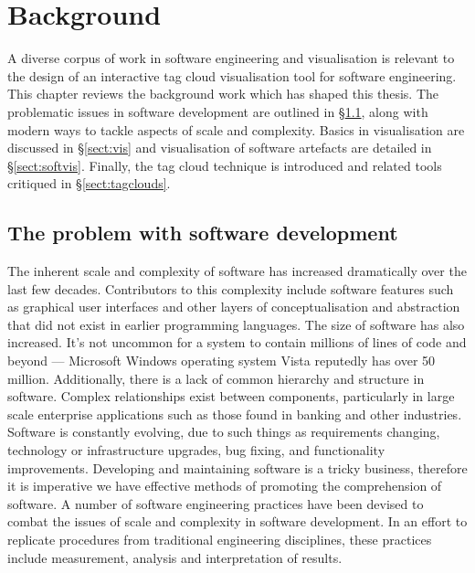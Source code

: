 
\chapter{Background}\label{chap:background}
\ifpdf
    \graphicspath{{Chapters/Background/BackgroundFigs/PNG/}{Background/BackgroundFigs/PDF/}{Chapters/Background/BackgroundFigs/}}
\else
    \graphicspath{{Chapters/Background/BackgroundFigs/EPS/}{Chapters/Background/BackgroundFigs/}}
\fi

A diverse corpus of work in software engineering and visualisation is relevant to the design of an interactive tag cloud visualisation tool for software engineering. This chapter reviews the background work which has shaped this thesis. The problematic issues in software development are outlined in \S\ref{sect:problemsoftware}, along with modern ways to tackle aspects of scale and complexity. Basics in visualisation are discussed in \S\ref{sect:vis} and visualisation of software artefacts are detailed in \S\ref{sect:softvis}. Finally, the tag cloud technique is introduced and related tools critiqued in \S\ref{sect:tagclouds}.

\section{The problem with software development}\label{sect:problemsoftware}

The inherent scale and complexity of software has increased dramatically over the last few decades. Contributors to this complexity include software features such as graphical user interfaces and other layers of conceptualisation and abstraction that did not exist in earlier programming languages. The size of software has also increased. It's not uncommon for a system to contain millions of lines of code and beyond --- Microsoft Windows operating system Vista reputedly has over 50 million. Additionally, there is a lack of common hierarchy and structure in software. Complex relationships exist between components, particularly in large scale enterprise applications such as those found in banking and other industries. Software is constantly evolving, due to such things as requirements changing, technology or infrastructure upgrades, bug fixing, and functionality improvements. Developing and maintaining software is a tricky business, therefore it is imperative we have effective methods of promoting the comprehension of software. A number of software engineering practices have been devised to combat the issues of scale and complexity in software development. In an effort to replicate procedures from traditional engineering disciplines, these practices include measurement, analysis and interpretation of results.

